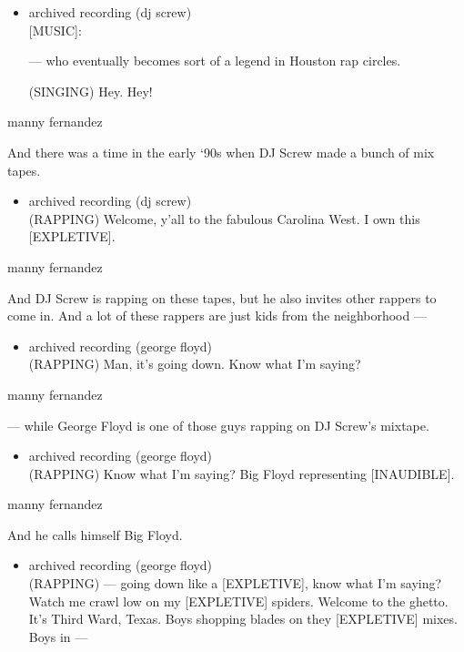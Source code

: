 \begin{itemize}
\item
  archived recording (dj screw)\\
  {[}MUSIC{]}:

  --- who eventually becomes sort of a legend in Houston rap circles.

  (SINGING) Hey. Hey!
\end{itemize}

manny fernandez

And there was a time in the early `90s when DJ Screw made a bunch of mix
tapes.

\begin{itemize}
\tightlist
\item
  archived recording (dj screw)\\
  (RAPPING) Welcome, y'all to the fabulous Carolina West. I own this
  {[}EXPLETIVE{]}.
\end{itemize}

manny fernandez

And DJ Screw is rapping on these tapes, but he also invites other
rappers to come in. And a lot of these rappers are just kids from the
neighborhood ---

\begin{itemize}
\tightlist
\item
  archived recording (george floyd)\\
  (RAPPING) Man, it's going down. Know what I'm saying?
\end{itemize}

manny fernandez

--- while George Floyd is one of those guys rapping on DJ Screw's
mixtape.

\begin{itemize}
\tightlist
\item
  archived recording (george floyd)\\
  (RAPPING) Know what I'm saying? Big Floyd representing
  {[}INAUDIBLE{]}.
\end{itemize}

manny fernandez

And he calls himself Big Floyd.

\begin{itemize}
\tightlist
\item
  archived recording (george floyd)\\
  (RAPPING) --- going down like a {[}EXPLETIVE{]}, know what I'm saying?
  Watch me crawl low on my {[}EXPLETIVE{]} spiders. Welcome to the
  ghetto. It's Third Ward, Texas. Boys shopping blades on they
  {[}EXPLETIVE{]} mixes. Boys in ---
\end{itemize}

